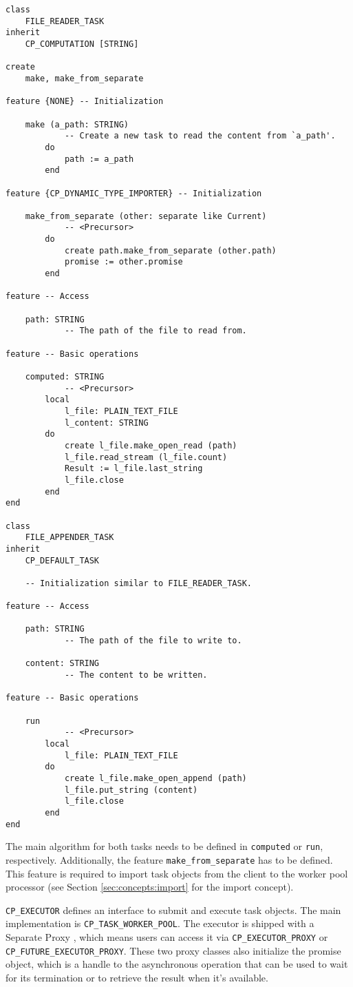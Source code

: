 \begin{lstlisting}[language=OOSC2Eiffel, label={code:file-tasks}, captionpos=b, caption={The file reader and appender classes.}]
class
	FILE_READER_TASK
inherit
	CP_COMPUTATION [STRING]

create
	make, make_from_separate

feature {NONE} -- Initialization

	make (a_path: STRING)
			-- Create a new task to read the content from `a_path'.
		do
			path := a_path
		end

feature {CP_DYNAMIC_TYPE_IMPORTER} -- Initialization

	make_from_separate (other: separate like Current)
			-- <Precursor>
		do
			create path.make_from_separate (other.path)
			promise := other.promise
		end

feature -- Access

	path: STRING
			-- The path of the file to read from.

feature -- Basic operations

	computed: STRING
			-- <Precursor>
		local
			l_file: PLAIN_TEXT_FILE
			l_content: STRING
		do
			create l_file.make_open_read (path)
			l_file.read_stream (l_file.count)
			Result := l_file.last_string
			l_file.close
		end
end

class
	FILE_APPENDER_TASK
inherit
	CP_DEFAULT_TASK

    -- Initialization similar to FILE_READER_TASK.
	
feature -- Access

	path: STRING
			-- The path of the file to write to.

	content: STRING
			-- The content to be written.

feature -- Basic operations

	run
			-- <Precursor>
		local
			l_file: PLAIN_TEXT_FILE
		do
			create l_file.make_open_append (path)
			l_file.put_string (content)
			l_file.close
		end
end
\end{lstlisting}

The main algorithm for both tasks needs to be defined in \lstinline!computed! or \lstinline!run!, respectively.
Additionally, the feature \lstinline!make_from_separate! has to be defined.
This feature is required to import task objects from the client to the worker pool processor (see Section \ref{sec:concepts:import} for the import concept).

\lstinline!CP_EXECUTOR! defines an interface to submit and execute task objects.
The main implementation is \lstinline!CP_TASK_WORKER_POOL!.
The executor is shipped with a Separate Proxy , which means users can access it via \lstinline!CP_EXECUTOR_PROXY! or \lstinline!CP_FUTURE_EXECUTOR_PROXY!.
These two proxy classes also initialize the promise object, which is a handle to the asynchronous operation that can be used to wait for its termination or to retrieve the result when it's available.

